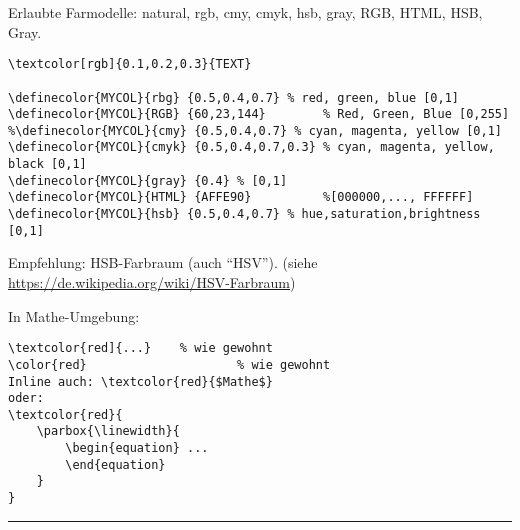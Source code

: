 \begin{minipage}{\linewidth}
\begin{multicols}{2}

\end{multicols}
\end{minipage}
\setlength{\columnseprule}{0.5pt}

Erlaubte Farmodelle: natural, rgb, cmy, cmyk, hsb, gray, RGB, HTML, HSB, Gray.
\begin{lstlisting}
\textcolor[rgb]{0.1,0.2,0.3}{TEXT}

\definecolor{MYCOL}{rbg} {0.5,0.4,0.7} % red, green, blue [0,1]
\definecolor{MYCOL}{RGB} {60,23,144}		% Red, Green, Blue [0,255]
%\definecolor{MYCOL}{cmy} {0.5,0.4,0.7}	% cyan, magenta, yellow [0,1]
\definecolor{MYCOL}{cmyk} {0.5,0.4,0.7,0.3}	% cyan, magenta, yellow, black [0,1]
\definecolor{MYCOL}{gray} {0.4} % [0,1]
\definecolor{MYCOL}{HTML} {AFFE90}          %[000000,..., FFFFFF]
\definecolor{MYCOL}{hsb} {0.5,0.4,0.7} % hue,saturation,brightness [0,1]
\end{lstlisting}
Empfehlung: HSB-Farbraum (auch "`HSV"'). {\footnotesize (siehe \url{https://de.wikipedia.org/wiki/HSV-Farbraum})}


\negAbstand
{}
In Mathe-Umgebung:
\begin{lstlisting}
\textcolor{red]{...}	% wie gewohnt
\color{red}						% wie gewohnt
Inline auch: \textcolor{red}{$Mathe$}
oder:
\textcolor{red}{
	\parbox{\linewidth}{
		\begin{equation} ...
		\end{equation}
	}
}
\end{lstlisting}
\hrule \vspace{0.5\baselineskip}
